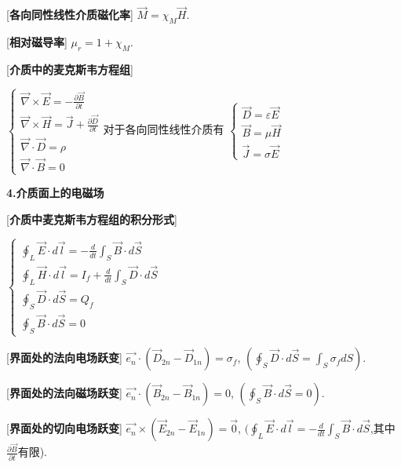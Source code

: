 [\textbf{各向同性线性介质磁化率}] $\vec M=\chi_M\vec H$.\par

[\textbf{相对磁导率}] $\mu_r=1+\chi_M$.\par

[\textbf{介质中的麦克斯韦方程组}] \par
\qquad $\begin{cases} \vec\nabla\times\vec E=-\frac{\partial\vec B}{\partial t}\\ \vec\nabla\times\vec H=\vec J+\frac{\partial\vec D}{\partial t}\\ \vec\nabla\cdot\vec D=\rho\\ \vec\nabla\cdot\vec B=0 \end{cases}$\qquad 对于各向同性线性介质有 $\begin{cases}\vec D=\varepsilon \vec E\\ \vec B=\mu\vec H\\\vec J=\sigma\vec E\end{cases}$\par

\begin{center}
 \textbf{4.介质面上的电磁场}
\end{center}

[\textbf{介质中麦克斯韦方程组的积分形式}]\par
\qquad $\begin{cases}\oint_L\vec E\cdot d\vec l=-\frac{d}{dt}\int_S\vec B\cdot d\vec S\\\oint_L\vec H\cdot d\vec l=I_f+\frac{d}{dt}\int_S\vec D\cdot d\vec S\\\oint_S\vec D\cdot d\vec S=Q_f\\\oint_S\vec B\cdot d\vec S=0\end{cases}$\par

[\textbf{界面处的法向电场跃变}] $\vec{e_n}\cdot(\vec D_{2n}-\vec D_{1n})=\sigma_f$, $(\oint_S\vec D\cdot d\vec S=\int_S\sigma_fdS)$.\par

[\textbf{界面处的法向磁场跃变}] $\vec{e_n}\cdot(\vec B_{2n}-\vec B_{1n})=0$, $(\oint_S\vec B\cdot d\vec S=0)$.\par

[\textbf{界面处的切向电场跃变}] $\vec{e_n}\times(\vec E_{2n}-\vec E_{1n})=\vec 0$, $(\oint_L\vec E\cdot d\vec l=-\frac{d}{dt}\int_S\vec B\cdot d\vec S$,其中$\frac{\partial \vec B}{\partial t}$有限).\par

